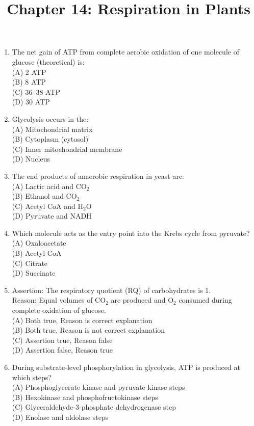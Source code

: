 \documentclass{article}
\begin{document}
\title{Chapter 14: Respiration in Plants}
\date{}
\maketitle

\begin{enumerate}[label=Q\arabic*.]

\item The net gain of ATP from complete aerobic oxidation of one molecule of glucose (theoretical) is:
\\(A) 2 ATP
\\(B) 8 ATP
\\(C) 36--38 ATP
\\(D) 30 ATP

\item Glycolysis occurs in the:
\\(A) Mitochondrial matrix
\\(B) Cytoplasm (cytosol)
\\(C) Inner mitochondrial membrane
\\(D) Nucleus

\item The end products of anaerobic respiration in yeast are:
\\(A) Lactic acid and CO$_2$
\\(B) Ethanol and CO$_2$
\\(C) Acetyl CoA and H$_2$O
\\(D) Pyruvate and NADH

\item Which molecule acts as the entry point into the Krebs cycle from pyruvate?
\\(A) Oxaloacetate
\\(B) Acetyl CoA
\\(C) Citrate
\\(D) Succinate

\item Assertion: The respiratory quotient (RQ) of carbohydrates is 1.\\
Reason: Equal volumes of CO$_2$ are produced and O$_2$ consumed during complete oxidation of glucose.
\\(A) Both true, Reason is correct explanation
\\(B) Both true, Reason is not correct explanation
\\(C) Assertion true, Reason false
\\(D) Assertion false, Reason true

\item During substrate-level phosphorylation in glycolysis, ATP is produced at which steps?
\\(A) Phosphoglycerate kinase and pyruvate kinase steps
\\(B) Hexokinase and phosphofructokinase steps
\\(C) Glyceraldehyde-3-phosphate dehydrogenase step
\\(D) Enolase and aldolase steps


\end{enumerate}
\end{document}
